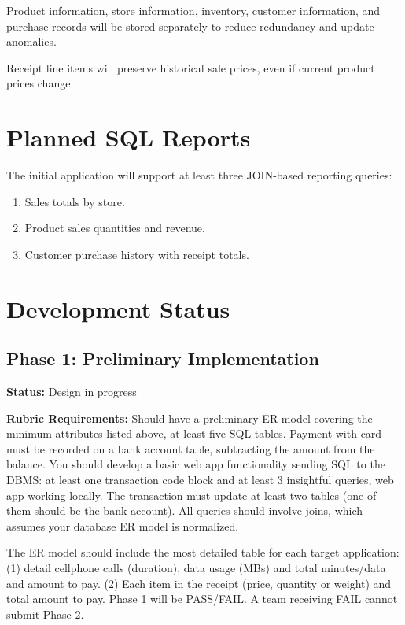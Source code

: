 \documentclass[11pt, a4paper]{article}
\begin{document}
Product information, store information, inventory, customer information, and purchase records will be stored separately to reduce redundancy and update anomalies.

Receipt line items will preserve historical sale prices, even if current product prices change.

\section{Planned SQL Reports}
The initial application will support at least three JOIN-based reporting queries:
\begin{enumerate}[leftmargin=1.5em, itemsep=2pt]
    \item Sales totals by store.
    \item Product sales quantities and revenue.
    \item Customer purchase history with receipt totals.
\end{enumerate}

\section{Development Status}

\subsection{Phase 1: Preliminary Implementation}

\textbf{Status:} Design in progress

\textbf{Rubric Requirements:} Should have a preliminary ER model covering the minimum attributes listed above, at
least five SQL tables. Payment with card must be recorded on a bank account table, subtracting
the amount from the balance. You should develop a basic web app functionality sending SQL
to the DBMS: at least one transaction code block and at least 3 insightful queries, web app
working locally. The transaction must update at least two tables (one of them should be the
bank account). All queries should involve joins, which assumes your database ER model is
normalized.

The ER model should include the most detailed table for each target application: (1) detail
cellphone calls (duration), data usage (MBs) and total minutes/data and amount to pay. (2)
Each item in the receipt (price, quantity or weight) and total amount to pay. Phase 1 will be
PASS/FAIL. A team receiving FAIL cannot submit Phase 2.
\end{document}
